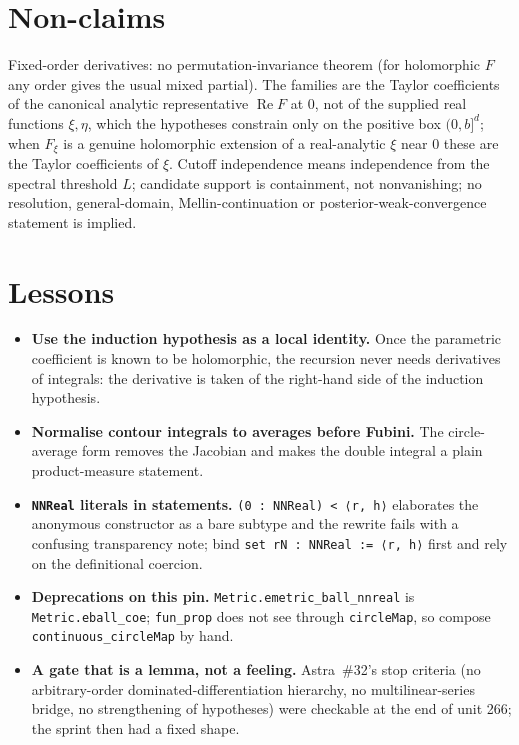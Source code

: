 \documentclass[11pt]{article}
\begin{document}
\section{Non-claims}
Fixed-order derivatives: no permutation-invariance theorem (for holomorphic $F$ any order gives the
usual mixed partial). The families are the Taylor coefficients of the canonical analytic representative
$\operatorname{Re}F$ at $0$, not of the supplied real functions $\xi,\eta$, which the hypotheses
constrain only on the positive box $(0,b]^d$; when $F_\xi$ is a genuine holomorphic extension of a
real-analytic $\xi$ near $0$ these are the Taylor coefficients of $\xi$. Cutoff independence means
independence from the spectral threshold $L$; candidate support is containment, not nonvanishing; no
resolution, general-domain, Mellin-continuation or posterior-weak-convergence statement is implied.

\section{Lessons}
\begin{itemize}
\item \textbf{Use the induction hypothesis as a local identity.} Once the parametric coefficient is
known to be holomorphic, the recursion never needs derivatives of integrals: the derivative is taken of
the right-hand side of the induction hypothesis.
\item \textbf{Normalise contour integrals to averages before Fubini.} The circle-average form removes
the Jacobian and makes the double integral a plain product-measure statement.
\item \textbf{\texttt{NNReal} literals in statements.} \texttt{(0 : NNReal) < ⟨r, h⟩} elaborates the
anonymous constructor as a bare subtype and the rewrite fails with a confusing transparency note;
bind \texttt{set rN : NNReal := ⟨r, h⟩} first and rely on the definitional coercion.
\item \textbf{Deprecations on this pin.} \texttt{Metric.emetric\_ball\_nnreal} is
\texttt{Metric.eball\_coe}; \texttt{fun\_prop} does not see through \texttt{circleMap}, so compose
\texttt{continuous\_circleMap} by hand.
\item \textbf{A gate that is a lemma, not a feeling.} Astra~\#32's stop criteria (no arbitrary-order
dominated-differentiation hierarchy, no multilinear-series bridge, no strengthening of hypotheses) were
checkable at the end of unit 266; the sprint then had a fixed shape.
\end{itemize}
\end{document}
